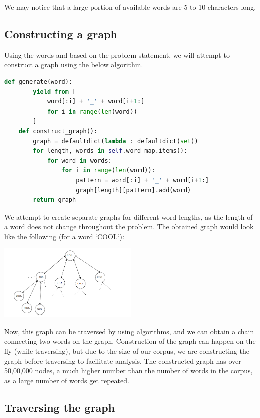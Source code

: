 \documentclass[]{article}
\begin{document}
We may notice that a large portion of available words are 5 to 10 characters long.

\subsection{Constructing a graph}

Using the words and based on the problem statement, we will attempt to construct a graph using the below algorithm.

\begin{lstlisting}[language=Python]
	def generate(word):
		yield from [
			word[:i] + '_' + word[i+1:]
			for i in range(len(word))
		]
	def construct_graph():
		graph = defaultdict(lambda : defaultdict(set))
		for length, words in self.word_map.items():
			for word in words:
				for i in range(len(word)):
					pattern = word[:i] + '_' + word[i+1:]
					graph[length][pattern].add(word)
		return graph
\end{lstlisting}

We attempt to create separate graphs for different word lengths, as the length of a word does not change throughout the problem. The obtained graph would look like the following (for a word `COOL`):

\begin{center}
	\includegraphics[width=0.5\textwidth]{./images/graph.png}	
\end{center}


Now, this graph can be traversed by using algorithms, and we can obtain a chain connecting two words on the graph. Construction of the graph can happen on the fly (while traversing), but due to the size of our corpus, we are constructing the graph before traversing to facilitate analysis. The constructed graph has over 50,00,000 nodes, a much higher number than the number of words in the corpus, as a large number of words get repeated.

\subsection{Traversing the graph}
\end{document}
